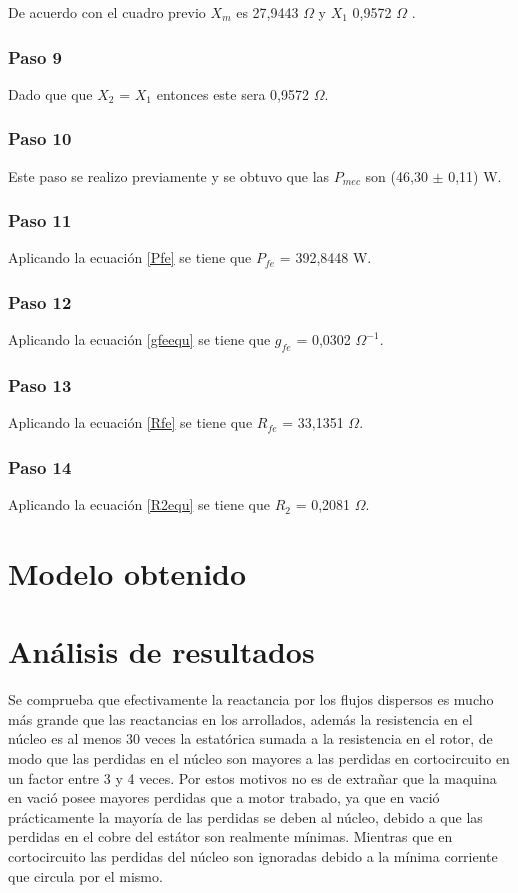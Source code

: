\documentclass[11pt,letterpaper]{article}     %
\begin{document}
De acuerdo con el cuadro previo $X_{m}$ es 27,9443 $\Omega$ y $X_{1}$ 0,9572 $\Omega$ .
\subsubsection{Paso 9}
Dado que que $X_{2}$ = $X_{1}$ entonces este sera 0,9572 $\Omega$.
\subsubsection{Paso 10}
Este paso se realizo previamente y se obtuvo que las $P_{mec}$ son (46,30 $\pm$ 0,11) W.
\subsubsection{Paso 11}
Aplicando la ecuación \ref{Pfe} se tiene que $P_{fe}$ = 392,8448 W.
\subsubsection{Paso 12}
Aplicando la ecuación \ref{gfeequ} se tiene que $g_{fe}$ = 0,0302 $\Omega^{-1}$.
\subsubsection{Paso 13}
Aplicando la ecuación \ref{Rfe} se tiene que $R_{fe}$ = 33,1351 $\Omega$.
\subsubsection{Paso 14}
Aplicando la ecuación \ref{R2equ} se tiene que $R_{2}$ = 0,2081 $\Omega$.
\section{Modelo obtenido} 
\newpage
\section{Análisis de resultados}
Se comprueba que efectivamente la reactancia por los flujos dispersos es mucho más grande que las reactancias en los arrollados, además la resistencia en el núcleo es al menos 30 veces la estatórica sumada a la resistencia en el rotor, de modo que las perdidas en el núcleo son mayores a las perdidas en cortocircuito en un factor entre 3 y 4 veces. Por estos motivos no es de extrañar que la maquina en vació posee mayores perdidas que a motor trabado, ya que en vació prácticamente la mayoría de las perdidas se deben al núcleo, debido a que las perdidas en el cobre del estátor son realmente mínimas. Mientras que en cortocircuito las perdidas del núcleo son ignoradas debido a la mínima corriente que circula por el mismo.
\newpage
\end{document}
